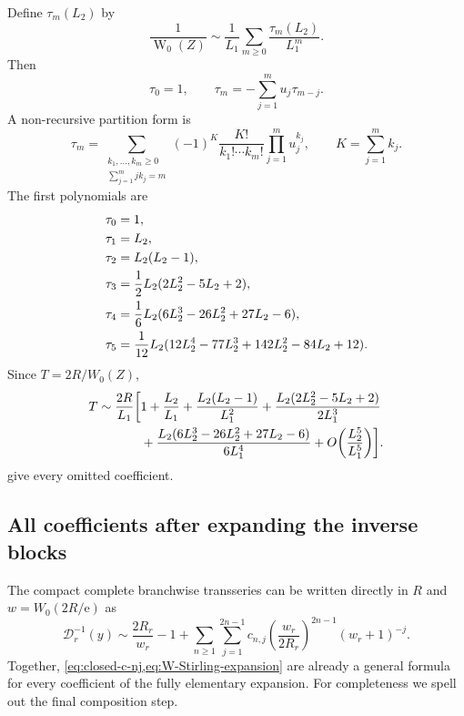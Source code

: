 \documentclass[11pt,a4paper,oneside]{article}
\theoremstyle{plain}
\theoremstyle{definition}
\theoremstyle{remark}
\newcommand{\e}{\mathrm e}
\newcommand{\W}{\operatorname W}
\newcommand{\D}{\mathcal D}
\begin{document}
Define $\tau_m(L_2)$ by
\begin{equation}
 \frac1{\W_0(Z)}\sim\frac1{L_1}
 \sum_{m\ge0}\frac{\tau_m(L_2)}{L_1^m}.
 \label{eq:tau-def}
\end{equation}
Then
\begin{equation}
 \tau_0=1,
 \qquad
 \tau_m=-\sum_{j=1}^m u_j\tau_{m-j}.
 \label{eq:tau-recurrence}
\end{equation}
A non-recursive partition form is
\begin{equation}
 \tau_m=
 \sum_{\substack{k_1,\ldots,k_m\ge0\\
                  \sum_{j=1}^mjk_j=m}}
 (-1)^K\frac{K!}{k_1!\cdots k_m!}
 \prod_{j=1}^m u_j^{k_j},
 \qquad K=\sum_{j=1}^m k_j.
 \label{eq:tau-partition}
\end{equation}
The first polynomials are
\begin{align}
 \tau_0={}&1,
 \notag\\
 \tau_1={}&L_2,
 \notag\\
 \tau_2={}&L_2(L_2-1),
 \notag\\
 \tau_3={}&\frac12L_2(2L_2^2-5L_2+2),
 \notag\\
 \tau_4={}&\frac16L_2(6L_2^3-26L_2^2+27L_2-6),
 \label{eq:tau-first}\\
 \tau_5={}&\frac1{12}L_2
 (12L_2^4-77L_2^3+142L_2^2-84L_2+12).
 \notag
\end{align}
Since $T=2R/W_0(Z)$,
\begin{align}
 T\sim\frac{2R}{L_1}\biggl[{}&1+\frac{L_2}{L_1}
 +\frac{L_2(L_2-1)}{L_1^2}
 +\frac{L_2(2L_2^2-5L_2+2)}{2L_1^3}
 \notag\\
 &+\frac{L_2(6L_2^3-26L_2^2+27L_2-6)}{6L_1^4}
 +O\!\left(\frac{L_2^5}{L_1^5}\right)\biggr].
 \label{eq:T-outer-first}
\end{align}
 give every omitted coefficient.

\subsection{All coefficients after expanding the inverse blocks}

The compact complete branchwise transseries can be written directly in $R$
and $w=W_0(2R/\e)$ as
\begin{equation}
 \boxed{
 \D_r^{-1}(y)\sim
 \frac{2R_r}{w_r}-1+
 \sum_{n\ge1}\sum_{j=1}^{2n-1}
 c_{n,j}
 \left(\frac{w_r}{2R_r}\right)^{2n-1}
 (w_r+1)^{-j}.}
 \label{eq:compact-full-transseries}
\end{equation}
Together, \cref{eq:closed-c-nj,eq:W-Stirling-expansion} are already a general
formula for every coefficient of the fully elementary expansion.  For
completeness we spell out the final composition step.
\end{document}
